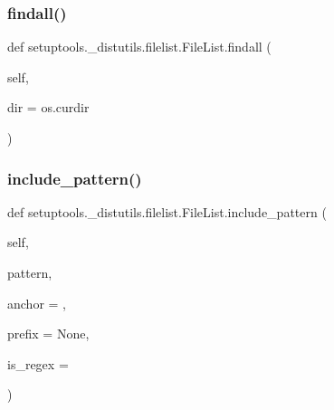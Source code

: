 \subsubsection{\texorpdfstring{findall()}{findall()}}
{\footnotesize\ttfamily def setuptools.\+\_\+distutils.\+filelist.\+File\+List.\+findall (\begin{DoxyParamCaption}\item[{}]{self,  }\item[{}]{dir = {\ttfamily os.curdir} }\end{DoxyParamCaption})}

\mbox{\label{classsetuptools_1_1__distutils_1_1filelist_1_1FileList_a91dd74782ce2e90e381652cc4b51cf7a}} 
\subsubsection{\texorpdfstring{include\+\_\+pattern()}{include\_pattern()}}
{\footnotesize\ttfamily def setuptools.\+\_\+distutils.\+filelist.\+File\+List.\+include\+\_\+pattern (\begin{DoxyParamCaption}\item[{}]{self,  }\item[{}]{pattern,  }\item[{}]{anchor = {},  }\item[{}]{prefix = {\ttfamily None},  }\item[{}]{is\+\_\+regex = {} }\end{DoxyParamCaption})}

